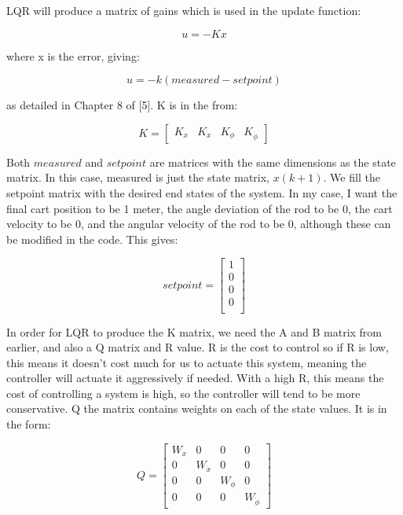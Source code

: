 \documentclass{article}
\begin{document}
LQR will produce a matrix of gains which is used in the update function:

\begin{equation}
    u = -Kx
\end{equation}

\noindent where x is the error, giving:

\begin{equation}
    u = -k(measured - setpoint)
\end{equation}

\noindent as detailed in Chapter 8 of [5]. K is in the from:

\begin{equation}
    K = 
    \begin{bmatrix}
        K_x & K_{\Dot{x}} & K_{\phi} & K_{\Dot{\phi}}
    \end{bmatrix}
\end{equation}

Both $measured$ and $setpoint$ are matrices with the same dimensions as the state matrix. In this case, measured is just the state matrix, $x(k+1)$. We fill the setpoint matrix with the desired end states of the system. In my case, I want the final cart position to be 1 meter, the angle deviation of the rod to be 0, the cart velocity to be 0, and the angular velocity of the rod to be 0, although these can be modified in the code. This gives:

\begin{equation}
    setpoint = 
    \begin{bmatrix}
        1 \\
        0 \\
        0 \\
        0 \\
    \end{bmatrix}
\end{equation}

In order for LQR to produce the K matrix, we need the A and B matrix from earlier, and also a Q matrix and R value. R is the cost to control so if R is low, this means it doesn't cost much for us to actuate this system, meaning the controller will actuate it aggressively if needed. With a high R, this means the cost of controlling a system is high, so the controller will tend to be more conservative. Q the matrix contains weights on each of the state values. It is in the form:

\begin{equation}
    Q = 
    \begin{bmatrix}
        W_x & 0 & 0 & 0 \\
        0 & W_{\Dot{x}} & 0 & 0 \\
        0 & 0 & W_\phi & 0 \\
        0 & 0 & 0 & W_{\Dot{\phi}} 
    \end{bmatrix}
\end{equation}
\end{document}
